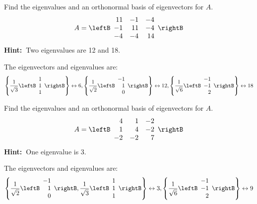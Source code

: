 \begin{enumialphparenastyle}

\begin{ex} Find the eigenvalues and an orthonormal basis of eigenvectors for $A.$ 
\begin{equation*}
A=\leftB 
\begin{array}{rrr}
11 & -1 & -4 \\ 
-1 & 11 & -4 \\ 
-4 & -4 & 14
\end{array}
\rightB 
\end{equation*}
\textbf{Hint:\ }Two eigenvalues are 12 and 18.
\begin{sol}
The eigenvectors and eigenvalues are:
\[
\left\{ \frac{1}{\sqrt{3}}\leftB
\begin{array}{c}
1 \\
1 \\
1
\end{array}
\rightB \right\} \leftrightarrow 6,\left\{ \frac{1}{\sqrt{2}}\leftB
\begin{array}{r}
-1 \\
1 \\
0
\end{array}
\rightB \right\} \leftrightarrow 12,\left\{ \frac{1}{\sqrt{6}}\leftB
\begin{array}{r}
-1 \\
-1 \\
2
\end{array}
\rightB \right\} \leftrightarrow 18
\]
\end{sol}
\end{ex}

\begin{ex} Find the eigenvalues and an orthonormal basis of eigenvectors for $A.$ 
\begin{equation*}
A=\leftB 
\begin{array}{rrr}
4 & 1 & -2 \\ 
1 & 4 & -2 \\ 
-2 & -2 & 7
\end{array}
\rightB 
\end{equation*}
\textbf{Hint:\ }One eigenvalue is 3.
\begin{sol}
The eigenvectors and eigenvalues are:
\[
\left\{ \frac{1}{\sqrt{2}}\leftB
\begin{array}{r}
-1 \\
1 \\
0
\end{array}
\rightB ,\frac{1}{\sqrt{3}}\leftB
\begin{array}{c}
1 \\
1 \\
1
\end{array}
\rightB \right\} \leftrightarrow 3,\left\{ \frac{1}{\sqrt{6}}\leftB
\begin{array}{r}
-1 \\
-1 \\
2
\end{array}
\rightB \right\} \leftrightarrow 9
\]
\end{sol}
\end{ex}


\end{enumialphparenastyle}
